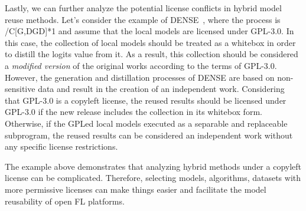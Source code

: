 \documentclass[journal]{IEEEtran}
\begin{document}
Lastly, we can further analyze the potential license conflicts in hybrid model reuse methods. Let's consider the example of DENSE~\cite{zhang2022dense}, where the process is /C[G,DGD]*1 and assume that the local models are licensed under GPL-3.0.
In this case, the collection of local models should be treated as a whitebox in order to distill the logits value from it. 
As a result, this collection should be considered a \textit{modified version} of the original works according to the terms of GPL-3.0.
However, the generation and distillation processes of DENSE are based on non-sensitive data and result in the creation of an independent work.
Considering that GPL-3.0 is a copyleft license, the reused results should be licensed under GPL-3.0 if the new release includes the collection in its whitebox form. 
Otherwise, if the GPLed local models executed as a separable and replaceable subprogram, the reused results can be considered an independent work without any specific license restrictions.

The example above demonstrates that analyzing hybrid methods under a copyleft license can be complicated. 
Therefore, selecting models, algorithms, datasets with more permissive licenses can make things easier and facilitate the model reusability of open FL platforms.
\end{document}
